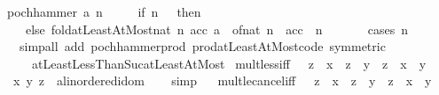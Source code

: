 \begin{isabellebody}
\ \ {\isachardoublequoteopen}pochhammer\ a\ n\ {\isacharequal}{\kern0pt}\isanewline
\ \ \ \ {\isacharparenleft}{\kern0pt}if\ n\ {\isacharequal}{\kern0pt}\ {}\ then\ {}\isanewline
\ \ \ \ \ else\ fold{\isacharunderscore}{\kern0pt}atLeastAtMost{\isacharunderscore}{\kern0pt}nat\ {\isacharparenleft}{\kern0pt}{\isasymlambda}n\ acc{\isachardot}{\kern0pt}\ {\isacharparenleft}{\kern0pt}a\ {\isacharplus}{\kern0pt}\ of{\isacharunderscore}{\kern0pt}nat\ n{\isacharparenright}{\kern0pt}\ {\isacharasterisk}{\kern0pt}\ acc{\isacharparenright}{\kern0pt}\ {}\ {\isacharparenleft}{\kern0pt}n\ {\isacharminus}{\kern0pt}\ {}{\isacharparenright}{\kern0pt}\ {}{\isacharparenright}{\kern0pt}{\isachardoublequoteclose}\isanewline
%
\isadelimproof
\ \ %
\endisadelimproof
%
\isatagproof
{}\isamarkupfalse%
\ {\isacharparenleft}{\kern0pt}cases\ n{\isacharparenright}{\kern0pt}\isanewline
\ \ \ \ {\isacharparenleft}{\kern0pt}simp{\isacharunderscore}{\kern0pt}all\ add{\isacharcolon}{\kern0pt}\ pochhammer{\isacharunderscore}{\kern0pt}prod\ prod{\isacharunderscore}{\kern0pt}atLeastAtMost{\isacharunderscore}{\kern0pt}code\ {\isacharbrackleft}{\kern0pt}symmetric{\isacharbrackright}{\kern0pt}\isanewline
\ \ \ \ \ \ atLeastLessThanSuc{\isacharunderscore}{\kern0pt}atLeastAtMost{\isacharparenright}{\kern0pt}%
\endisatagproof
{\isafoldproof}%
%
\isadelimproof
\isanewline
%
\endisadelimproof
\isanewline
\isanewline
{}\isamarkupfalse%
\ mult{\isacharunderscore}{\kern0pt}less{\isacharunderscore}{\kern0pt}iff{}{\isacharcolon}{\kern0pt}\ {\isachardoublequoteopen}{}\ {\isacharless}{\kern0pt}\ z\ {\isasymLongrightarrow}\ x\ {\isacharasterisk}{\kern0pt}\ z\ {\isacharless}{\kern0pt}\ y\ {\isacharasterisk}{\kern0pt}\ z\ {\isasymlongleftrightarrow}\ x\ {\isacharless}{\kern0pt}\ y{\isachardoublequoteclose}\isanewline
\ \ \ x\ y\ z\ {\isacharcolon}{\kern0pt}{\isacharcolon}{\kern0pt}\ {\isachardoublequoteopen}{\isacharprime}{\kern0pt}a{\isacharcolon}{\kern0pt}{\isacharcolon}{\kern0pt}linordered{\isacharunderscore}{\kern0pt}idom{\isachardoublequoteclose}\isanewline
%
\isadelimproof
\ \ %
\endisadelimproof
%
\isatagproof
{}\isamarkupfalse%
\ simp%
\endisatagproof
{\isafoldproof}%
%
\isadelimproof
\ \isanewline
%
\endisadelimproof
\isanewline
{}\isamarkupfalse%
\ mult{\isacharunderscore}{\kern0pt}le{\isacharunderscore}{\kern0pt}cancel{\isacharunderscore}{\kern0pt}iff{}{\isacharcolon}{\kern0pt}\ {\isachardoublequoteopen}{}\ {\isacharless}{\kern0pt}\ z\ {\isasymLongrightarrow}\ x\ {\isacharasterisk}{\kern0pt}\ z\ {\isasymle}\ y\ {\isacharasterisk}{\kern0pt}\ z\ {\isasymlongleftrightarrow}\ x\ {\isasymle}\ y{\isachardoublequoteclose}\isanewline

\end{isabellebody}
